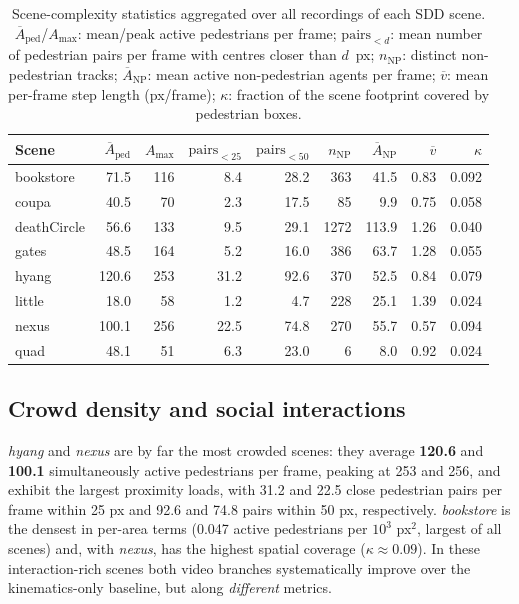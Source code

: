 \documentclass[11pt,a4paper]{article}
\begin{document}
\begin{table}[htpb]
    \centering
    \caption{Scene-complexity statistics aggregated over all recordings of each
    SDD scene. $\overline{A}_{\mathrm{ped}}$/$A_{\max}$: mean/peak active
    pedestrians per frame; $\mathrm{pairs}_{<d}$: mean number of pedestrian
    pairs per frame with centres closer than $d$~px; $n_{\mathrm{NP}}$: distinct
    non-pedestrian tracks; $\overline{A}_{\mathrm{NP}}$: mean active
    non-pedestrian agents per frame; $\overline{v}$: mean per-frame step length
    (px/frame); $\kappa$: fraction of the scene footprint covered by pedestrian
    boxes.\label{tab:complexity}}
    \small
    \setlength{\tabcolsep}{4pt}
    \begin{tabular}{l rrr rr rrr}
        \toprule
        Scene & $\overline{A}_{\mathrm{ped}}$ & $A_{\max}$
              & $\mathrm{pairs}_{<25}$ & $\mathrm{pairs}_{<50}$
              & $n_{\mathrm{NP}}$ & $\overline{A}_{\mathrm{NP}}$ & $\overline{v}$ & $\kappa$ \\
        \midrule
        bookstore   & 71.5  & 116 & 8.4  & 28.2 & 363 & 41.5 & 0.83 & 0.092 \\
        coupa       & 40.5  &  70 & 2.3  & 17.5 &  85 &  9.9 & 0.75 & 0.058 \\
        deathCircle & 56.6  & 133 & 9.5  & 29.1 &1272 &113.9 & 1.26 & 0.040 \\
        gates       & 48.5  & 164 & 5.2  & 16.0 & 386 & 63.7 & 1.28 & 0.055 \\
        hyang       & 120.6 & 253 & 31.2 & 92.6 & 370 & 52.5 & 0.84 & 0.079 \\
        little      & 18.0  &  58 & 1.2  &  4.7 & 228 & 25.1 & 1.39 & 0.024 \\
        nexus       & 100.1 & 256 & 22.5 & 74.8 & 270 & 55.7 & 0.57 & 0.094 \\
        quad        & 48.1  &  51 & 6.3  & 23.0 &   6 &  8.0 & 0.92 & 0.024 \\
        \bottomrule
    \end{tabular}
\end{table}

\subsection{Crowd density and social interactions}

\emph{hyang} and \emph{nexus} are by far the most crowded scenes: they average
\textbf{120.6} and \textbf{100.1} simultaneously active pedestrians per frame,
peaking at 253 and 256, and exhibit the largest proximity loads, with 31.2 and
22.5 close pedestrian pairs per frame within 25 px and 92.6 and 74.8 pairs
within 50 px, respectively. \emph{bookstore} is the densest in per-area terms
(0.047 active pedestrians per $10^3$ px$^2$, largest of all scenes) and, with
\emph{nexus}, has the highest spatial coverage ($\kappa \approx 0.09$). In
these interaction-rich scenes both video branches systematically improve over
the kinematics-only baseline, but along \emph{different} metrics.
\end{document}
